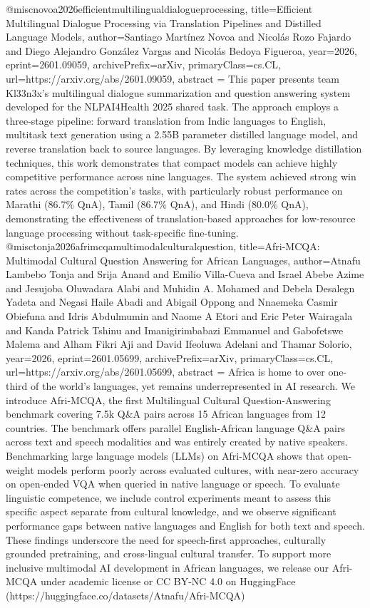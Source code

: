 {}@misc{novoa2026efficientmultilingualdialogueprocessing,
      title={Efficient Multilingual Dialogue Processing via Translation Pipelines and Distilled Language Models}, 
      author={Santiago Martínez Novoa and Nicolás Rozo Fajardo and Diego Alejandro González Vargas and Nicolás Bedoya Figueroa},
      year={2026},
      eprint={2601.09059},
      archivePrefix={arXiv},
      primaryClass={cs.CL},
      url={https://arxiv.org/abs/2601.09059},
      abstract = {This paper presents team Kl33n3x's multilingual dialogue summarization and question answering system developed for the NLPAI4Health 2025 shared task. The approach employs a three-stage pipeline: forward translation from Indic languages to English, multitask text generation using a 2.55B parameter distilled language model, and reverse translation back to source languages. By leveraging knowledge distillation techniques, this work demonstrates that compact models can achieve highly competitive performance across nine languages. The system achieved strong win rates across the competition's tasks, with particularly robust performance on Marathi (86.7\% QnA), Tamil (86.7\% QnA), and Hindi (80.0\% QnA), demonstrating the effectiveness of translation-based approaches for low-resource language processing without task-specific fine-tuning.}
}@misc{tonja2026afrimcqamultimodalculturalquestion,
      title={Afri-MCQA: Multimodal Cultural Question Answering for African Languages}, 
      author={Atnafu Lambebo Tonja and Srija Anand and Emilio Villa-Cueva and Israel Abebe Azime and Jesujoba Oluwadara Alabi and Muhidin A. Mohamed and Debela Desalegn Yadeta and Negasi Haile Abadi and Abigail Oppong and Nnaemeka Casmir Obiefuna and Idris Abdulmumin and Naome A Etori and Eric Peter Wairagala and Kanda Patrick Tshinu and Imanigirimbabazi Emmanuel and Gabofetswe Malema and Alham Fikri Aji and David Ifeoluwa Adelani and Thamar Solorio},
      year={2026},
      eprint={2601.05699},
      archivePrefix={arXiv},
      primaryClass={cs.CL},
      url={https://arxiv.org/abs/2601.05699},
      abstract = {Africa is home to over one-third of the world's languages, yet remains underrepresented in AI research. We introduce Afri-MCQA, the first Multilingual Cultural Question-Answering benchmark covering 7.5k Q&A pairs across 15 African languages from 12 countries. The benchmark offers parallel English-African language Q&A pairs across text and speech modalities and was entirely created by native speakers. Benchmarking large language models (LLMs) on Afri-MCQA shows that open-weight models perform poorly across evaluated cultures, with near-zero accuracy on open-ended VQA when queried in native language or speech. To evaluate linguistic competence, we include control experiments meant to assess this specific aspect separate from cultural knowledge, and we observe significant performance gaps between native languages and English for both text and speech. These findings underscore the need for speech-first approaches, culturally grounded pretraining, and cross-lingual cultural transfer. To support more inclusive multimodal AI development in African languages, we release our Afri-MCQA under academic license or CC BY-NC 4.0 on HuggingFace (https://huggingface.co/datasets/Atnafu/Afri-MCQA)}
}
